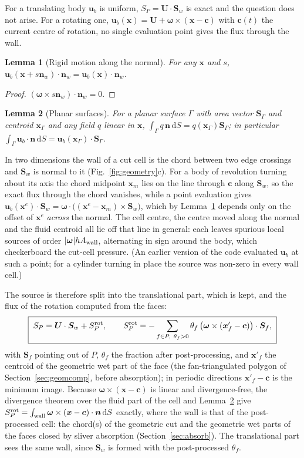 \documentclass[11pt,a4paper]{article}
\newtheorem{lemma}{Lemma}
\theoremstyle{remark}
\newcommand{\uu}{\bm{u}}
\newcommand{\ub}{\uu_b}
\newcommand{\nn}{\bm{n}}
\newcommand{\xx}{\bm{x}}
\newcommand{\Sf}{\bm{S}_f}
\newcommand{\Sw}{\bm{S}_w}
\newcommand{\dd}{\,\mathrm{d}}
\newcommand{\Aw}{A_{\rm wall}}
\begin{document}
For a translating body $\ub$ is uniform, $S_P=\bm U\cdot\Sw$ is exact and the question does not
arise. For a rotating one, $\ub(\xx)=\bm U+\bm\omega\times(\xx-\bm c)$ with $\bm c(t)$ the current
centre of rotation, no single evaluation point gives the flux through the wall.

\begin{lemma}[Rigid motion along the normal]
\label{lem:rignormal}
For any $\xx$ and $s$, $\ub(\xx+s\nn_w)\cdot\nn_w=\ub(\xx)\cdot\nn_w$.
\end{lemma}
\begin{proof}
$(\bm\omega\times s\nn_w)\cdot\nn_w=0$.
\end{proof}

\begin{lemma}[Planar surfaces]
\label{lem:planar}
For a planar surface $\Gamma$ with area vector $\bm S_\Gamma$ and centroid $\xx_\Gamma$ and any
field $q$ linear in $\xx$, $\int_\Gamma q\,\nn\dd S=q(\xx_\Gamma)\bm S_\Gamma$; in particular
$\int_\Gamma\ub\cdot\nn\dd S=\ub(\xx_\Gamma)\cdot\bm S_\Gamma$.
\end{lemma}

In two dimensions the wall of a cut cell is the chord between two edge crossings and $\Sw$ is
normal to it (Fig.~\ref{fig:geometry}c). For a body of revolution turning about its axis the
chord midpoint $\xx_m$ lies on the line through $\bm c$ along $\Sw$, so the exact flux through the
chord vanishes, while a point evaluation gives
$\ub(\xx^e)\cdot\Sw=\bm\omega\cdot\big((\xx^e-\xx_m)\times\Sw\big)$, which by
Lemma~\ref{lem:rignormal} depends only on the offset of $\xx^e$ \emph{across} the normal. The
cell centre, the centre moved along the normal and the fluid centroid all lie off that line in
general: each leaves spurious local sources of order $|\bm\omega|h\Aw$, alternating in sign
around the body, which checkerboard the cut-cell pressure. (An earlier version of the code
evaluated $\ub$ at such a point; for a cylinder turning in place the source was non-zero in
every wall cell.)

The source is therefore split into the translational part, which is kept, and the flux of the
rotation computed from the faces:
\begin{equation}
\boxed{\;S_P=\bm U\cdot\Sw+S^{\rm rot}_P,\qquad
S^{\rm rot}_P=-\sum_{f\in P,\ \theta_f>0}\theta_f\,\big(\bm\omega\times(\xx'_f-\bm c)\big)\cdot\Sf ,\;}
\label{eq:srot}
\end{equation}
with $\Sf$ pointing out of $P$, $\theta_f$ the fraction after post-processing, and $\xx'_f$ the
centroid of the geometric wet part of the face (the fan-triangulated polygon of
Section~\ref{sec:geomcomp}, before absorption); in periodic directions $\xx'_f-\bm c$ is the minimum
image. Because $\bm\omega\times(\xx-\bm c)$ is linear and divergence-free, the divergence theorem
over the fluid part of the cell and Lemma~\ref{lem:planar} give
$S^{\rm rot}_P=\int_{\rm wall}\bm\omega\times(\xx-\bm c)\cdot\nn\dd S$ exactly, where the wall is
that of the post-processed cell: the chord(s) of the geometric cut and the geometric wet parts of
the faces closed by sliver absorption (Section~\ref{sec:absorb}). The translational part sees the
same wall, since $\Sw$ is formed with the post-processed $\theta_f$.
\end{document}
